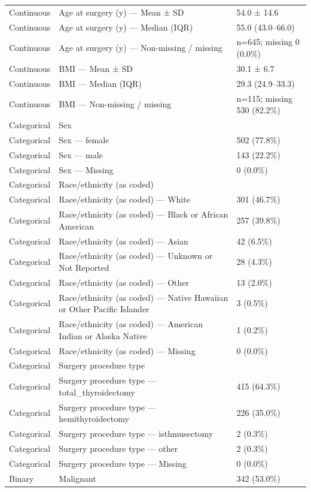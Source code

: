 \begin{table}[htbp]
\begin{tabular}{lll}
Continuous & Age at surgery (y) — Mean ± SD & 54.0 ± 14.6 \\
Continuous & Age at surgery (y) — Median (IQR) & 55.0 (43.0–66.0) \\
Continuous & Age at surgery (y) — Non-missing / missing & n=645; missing 0 (0.0\%) \\
Continuous & BMI — Mean ± SD & 30.1 ± 6.7 \\
Continuous & BMI — Median (IQR) & 29.3 (24.9–33.3) \\
Continuous & BMI — Non-missing / missing & n=115; missing 530 (82.2\%) \\
Categorical & Sex &  \\
Categorical & Sex — female & 502 (77.8\%) \\
Categorical & Sex — male & 143 (22.2\%) \\
Categorical & Sex — Missing & 0 (0.0\%) \\
Categorical & Race/ethnicity (as coded) &  \\
Categorical & Race/ethnicity (as coded) — White & 301 (46.7\%) \\
Categorical & Race/ethnicity (as coded) — Black or African American & 257 (39.8\%) \\
Categorical & Race/ethnicity (as coded) — Asian & 42 (6.5\%) \\
Categorical & Race/ethnicity (as coded) — Unknown or Not Reported & 28 (4.3\%) \\
Categorical & Race/ethnicity (as coded) — Other & 13 (2.0\%) \\
Categorical & Race/ethnicity (as coded) — Native Hawaiian or Other Pacific Islander & 3 (0.5\%) \\
Categorical & Race/ethnicity (as coded) — American Indian or Alaska Native & 1 (0.2\%) \\
Categorical & Race/ethnicity (as coded) — Missing & 0 (0.0\%) \\
Categorical & Surgery procedure type &  \\
Categorical & Surgery procedure type — total\_thyroidectomy & 415 (64.3\%) \\
Categorical & Surgery procedure type — hemithyroidectomy & 226 (35.0\%) \\
Categorical & Surgery procedure type — isthmusectomy & 2 (0.3\%) \\
Categorical & Surgery procedure type — other & 2 (0.3\%) \\
Categorical & Surgery procedure type — Missing & 0 (0.0\%) \\
Binary & Malignant & 342 (53.0\%) \\

\end{tabular}
\end{table}
